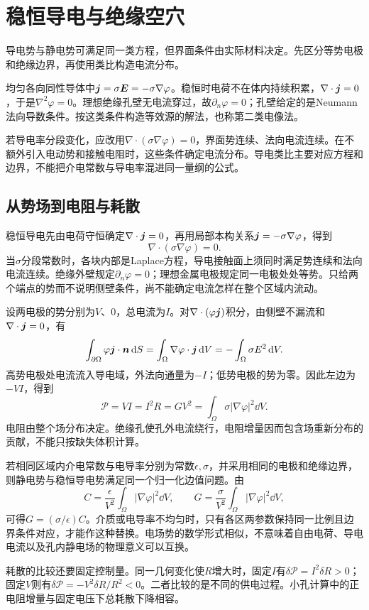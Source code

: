 \section{稳恒导电与绝缘空穴}\label{sec:es3-conduction}
导电势与静电势可满足同一类方程，但界面条件由实际材料决定。先区分等势电极和绝缘边界，再使用类比构造电流分布。

均匀各向同性导体中$\bm{j}=\sigma\bm{E}=-\sigma\nabla\varphi$。稳恒时电荷不在体内持续积累，$\nabla\cdot\bm{j}=0$，于是$\nabla^2\varphi=0$。理想绝缘孔壁无电流穿过，故$\partial_n\varphi=0$；孔壁给定的是Neumann法向导数条件。按这类条件构造等效源的解法，也称第二类电像法。

若导电率分段变化，应改用$\nabla\cdot(\sigma\nabla\varphi)=0$，界面势连续、法向电流连续。在不额外引入电动势和接触电阻时，这些条件确定电流分布。导电类比主要对应方程和边界，不能把介电常数与导电率混进同一量纲的公式。


\subsection{从势场到电阻与耗散}\label{sec:es-conduction-energy}
稳恒导电先由电荷守恒确定$\nabla\cdot\bm{j}=0$，再用局部本构关系$\bm{j}=-\sigma\nabla\varphi$，得到
\[\nabla\cdot(\sigma\nabla\varphi)=0.
\]
当$\sigma$分段常数时，各块内部是Laplace方程，导电接触面上须同时满足势连续和法向电流连续。绝缘外壁规定$\partial_n\varphi=0$；理想金属电极规定同一电极处处等势。只给两个端点的势而不说明侧壁条件，尚不能确定电流怎样在整个区域内流动。

设两电极的势分别为$V$、$0$，总电流为$I$。对$\nabla\cdot(\varphi\bm{j})$积分，由侧壁不漏流和$\nabla\cdot\bm{j}=0$，有
\[\int_{\partial\Omega}\varphi\bm{j}\cdot\bm{n}\mathop{}\!\mathrm d S
=\int_\Omega\nabla\varphi\cdot\bm{j}\mathop{}\!\mathrm d V
=-\int_\Omega\sigma E^2\mathop{}\!\mathrm d V.
\]
高势电极处电流流入导电域，外法向通量为$-I$；低势电极的势为零。因此左边为$-VI$，得到
\[\boxed{\mathcal P=VI=I^2R=GV^2
=\int_\Omega\sigma|\nabla\varphi|^2\dd V}.
\]
电阻由整个场分布决定。绝缘孔使孔外电流绕行，电阻增量因而包含场重新分布的贡献，不能只按缺失体积计算。

若相同区域内介电常数与电导率分别为常数$\epsilon,\sigma$，并采用相同的电极和绝缘边界，则静电势与稳恒导电势满足同一个归一化边值问题。由
\[C=\frac\epsilon{V^2}\int_\Omega|\nabla\varphi|^2\dd V,
\qquad G=\frac\sigma{V^2}\int_\Omega|\nabla\varphi|^2\dd V,
\]
可得$G=(\sigma/\epsilon)C$。介质或电导率不均匀时，只有各区两参数保持同一比例且边界条件对应，才能作这种替换。电场势的数学形式相似，不意味着自由电荷、导电电流以及孔内静电场的物理意义可以互换。

耗散的比较还要固定控制量。同一几何变化使$R$增大时，固定$I$有$\delta\mathcal P=I^2\delta R>0$；固定$V$则有$\delta\mathcal P=-V^2\delta R/R^2<0$。二者比较的是不同的供电过程。小孔计算中的正电阻增量与固定电压下总耗散下降相容。


